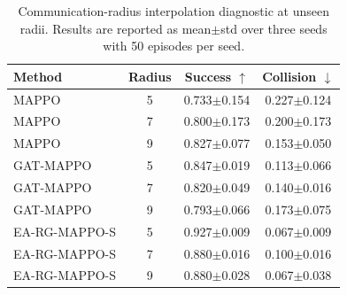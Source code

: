\begin{table}[t]
\centering
\caption{Communication-radius interpolation diagnostic at unseen radii. Results are reported as mean$\pm$std over three seeds with 50 episodes per seed.}
\label{tab:radius_interpolation}
\begin{tabular}{lccc}
\toprule
Method & Radius & Success $\uparrow$ & Collision $\downarrow$ \\
\midrule
MAPPO & 5 & 0.733$\pm$0.154 & 0.227$\pm$0.124 \\
MAPPO & 7 & 0.800$\pm$0.173 & 0.200$\pm$0.173 \\
MAPPO & 9 & 0.827$\pm$0.077 & 0.153$\pm$0.050 \\
\midrule
GAT-MAPPO & 5 & 0.847$\pm$0.019 & 0.113$\pm$0.066 \\
GAT-MAPPO & 7 & 0.820$\pm$0.049 & 0.140$\pm$0.016 \\
GAT-MAPPO & 9 & 0.793$\pm$0.066 & 0.173$\pm$0.075 \\
\midrule
EA-RG-MAPPO-S & 5 & 0.927$\pm$0.009 & 0.067$\pm$0.009 \\
EA-RG-MAPPO-S & 7 & 0.880$\pm$0.016 & 0.100$\pm$0.016 \\
EA-RG-MAPPO-S & 9 & 0.880$\pm$0.028 & 0.067$\pm$0.038 \\
\bottomrule
\end{tabular}
\end{table}
